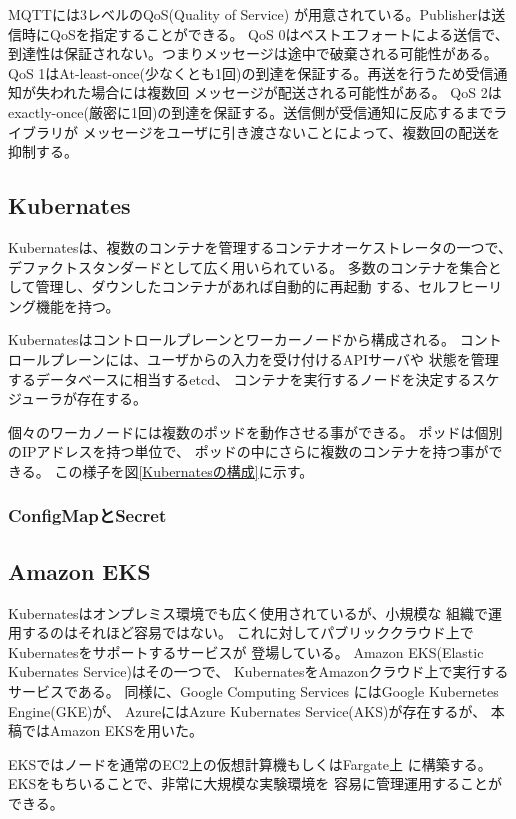 \documentclass[submit,techrep]{ipsj}
\newcommand{\reffig}[1]{図\ref{#1}}
\newcommand{\kbs}{Kubernates}
\begin{document}
MQTTには3レベルのQoS(Quality of Service) が用意されている。Publisherは送信時にQoSを指定することができる。
QoS 0はベストエフォートによる送信で、到達性は保証されない。つまりメッセージは途中で破棄される可能性がある。
QoS 1はAt-least-once(少なくとも1回)の到達を保証する。再送を行うため受信通知が失われた場合には複数回
メッセージが配送される可能性がある。
QoS 2はexactly-once(厳密に1回)の到達を保証する。送信側が受信通知に反応するまでライブラリが
メッセージをユーザに引き渡さないことによって、複数回の配送を抑制する。




\subsection{Kubernates}

\kbs\cite{k8s}は、複数のコンテナを管理するコンテナオーケストレータの一つで、
デファクトスタンダードとして広く用いられている。
多数のコンテナを集合として管理し、ダウンしたコンテナがあれば自動的に再起動
する、セルフヒーリング機能を持つ。

\kbs はコントロールプレーンとワーカーノードから構成される。
コントロールプレーンには、ユーザからの入力を受け付けるAPIサーバや
状態を管理するデータベースに相当するetcd、
コンテナを実行するノードを決定するスケジューラが存在する。

個々のワーカノードには複数のポッドを動作させる事ができる。
ポッドは個別のIPアドレスを持つ単位で、
ポッドの中にさらに複数のコンテナを持つ事ができる。
この様子を\reffig{\kbs の構成}に示す。

\subsubsection{ConfigMapとSecret}


\subsection{Amazon EKS}
\kbs はオンプレミス環境でも広く使用されているが、小規模な
組織で運用するのはそれほど容易ではない。
これに対してパブリッククラウド上で\kbs をサポートするサービスが
登場している。
%
Amazon EKS(Elastic Kubernates Service)\cite{EKS}はその一つで、
KubernatesをAmazonクラウド上で実行するサービスである。
同様に、Google Computing Services にはGoogle Kubernetes Engine(GKE)\cite{gks}が、
AzureにはAzure Kubernates Service(AKS)\cite{aks}が存在するが、
本稿ではAmazon EKSを用いた。

EKSではノードを通常のEC2上の仮想計算機もしくはFargate\cite{fargate}上
に構築する。EKSをもちいることで、非常に大規模な実験環境を
容易に管理運用することができる。
\end{document}
